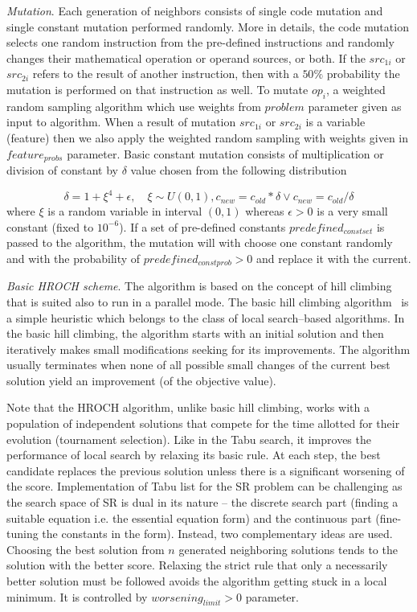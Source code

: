 \documentclass{bmcart}
\begin{document}
\textit{Mutation}. Each generation of neighbors consists of single code mutation and single constant mutation performed randomly. More in details, the code mutation selects one random instruction from the pre-defined instructions and randomly changes their mathematical operation or operand sources, or both. If the $src_{1i}$ or $src_{2i}$ refers to the result of another instruction, then with a $50\%$ probability the mutation is performed on that instruction as well. To mutate $op_i$, a weighted random sampling algorithm which use weights from $problem$ parameter given as input to algorithm. When a result of mutation $src_{1i}$ or $src_{2i}$ is a variable (feature) then we also apply the weighted random sampling with weights given in $feature_{probs}$ parameter. Basic constant mutation consists of multiplication or division of constant by $\delta$ value chosen from the following distribution

\begin{equation}\label{eq:hroch-mutation}
	\delta = 1 + \xi^4 + \epsilon, \quad \xi \sim U(0, 1),
	c_{new} = c_{old} * \delta \lor c_{new} = c_{old} / \delta
\end{equation}
where $\xi$ is a random variable in interval $(0, 1)$ whereas $\epsilon>0$ is a very small constant (fixed to $10^{-6}$). If a set of pre-defined constants $predefined_{const set}$ is passed to the algorithm, the mutation will with choose one constant randomly and with the probability  of $predefined_{const prob}>0$  and replace it with the current. 

\textit{Basic HROCH scheme}. The algorithm is based on the concept of hill climbing that is suited also to run in a parallel mode. The basic hill climbing algorithm~\cite{ohashi2003hill} is  a simple heuristic which belongs to the class of local search--based algorithms. In the basic hill climbing, the algorithm starts with an initial solution and then iteratively makes small modifications seeking for its improvements. The algorithm usually terminates when none of all possible small changes of the current best solution yield an improvement (of the objective value). 

Note that the HROCH algorithm, unlike basic hill climbing, works with a population of independent solutions that compete for the time allotted for their evolution (tournament selection). Like in the Tabu search, it improves the performance of local search by relaxing its basic rule. At each step, the best candidate replaces the previous solution unless there is a significant worsening of the score. Implementation of Tabu list for the SR problem can be challenging as the search space of SR is dual in its nature -- the discrete search part (finding a suitable equation i.e. the essential equation form) and the continuous part (fine-tuning the constants in the form). Instead, two complementary ideas are used. Choosing the best solution from $n$ generated neighboring solutions tends to the solution with the better score. Relaxing the strict rule that only a necessarily better solution must be followed avoids the algorithm getting stuck in a local minimum. It is controlled by $worsening_{limit}>0$ parameter.  
\end{document}
